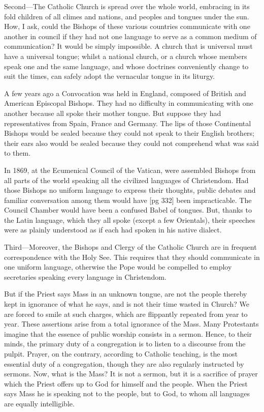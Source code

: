 Second—The Catholic Church is spread over the
whole world, embracing in its fold children of all
climes and nations, and peoples and tongues under
the sun. How, I ask, could the Bishops of these
various countries communicate with one another
in council if they had not one language to serve as
a common medium of communication? It would
be simply impossible. A church that is universal
must have a universal tongue; whilst a national
church, or a church whose members speak one and
the same language, and whose doctrines conveniently
change to suit the times, can safely adopt
the vernacular tongue in its liturgy.

A few years ago a Convocation was held in England,
composed of British and American Episcopal
Bishops. They had no difficulty in communicating
with one another because all spoke their mother
tongue. But suppose they had representatives
from Spain, France and Germany. The lips of
those Continental Bishops would be sealed because
they could not speak to their English brothers;
their ears also would be sealed because they could
not comprehend what was said to them.

In 1869, at the Ecumenical Council of the Vatican,
were assembled Bishops from all parts of the
world speaking all the civilized languages of
Christendom. Had those Bishops no uniform
language to express their thoughts, public debates
and familiar conversation among them would have
[pg 332]
been impracticable. The Council Chamber would
have been a confused Babel of tongues. But,
thanks to the Latin language, which they all spoke
(except a few Orientals), their speeches were as
plainly understood as if each had spoken in his
native dialect.

Third—Moreover, the Bishops and Clergy of
the Catholic Church are in frequent correspondence
with the Holy See. This requires that they
should communicate in one uniform language,
otherwise the Pope would be compelled to employ
secretaries speaking every language in Christendom.

But if the Priest says Mass in an unknown
tongue, are not the people thereby kept in ignorance
of what he says, and is not their time wasted
in Church? We are forced to smile at such
charges, which are flippantly repeated from year
to year. These assertions arise from a total ignorance
of the Mass. Many Protestants imagine that
the essence of public worship consists in a sermon.
Hence, to their minds, the primary duty of a congregation
is to listen to a discourse from the
pulpit. Prayer, on the contrary, according to
Catholic teaching, is the most essential duty of a
congregation, though they are also regularly instructed
by sermons. Now, what is the Mass? It
is not a sermon, but it is a sacrifice of prayer
which the Priest offers up to God for himself and
the people. When the Priest says Mass he is
speaking not to the people, but to God, to whom all
languages are equally intelligible.

